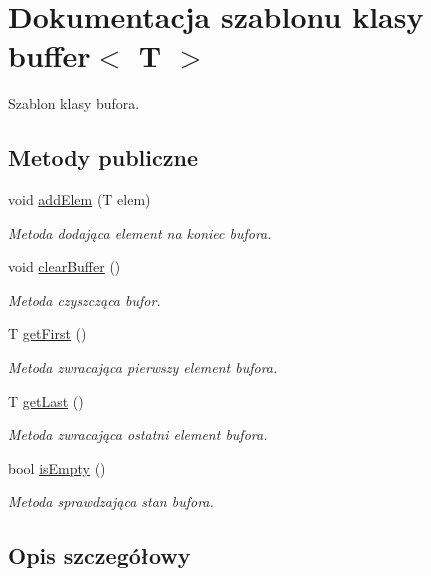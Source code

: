 \hypertarget{classbuffer}{}\section{Dokumentacja szablonu klasy buffer$<$ T $>$}
\label{classbuffer}


Szablon klasy bufora.  


\subsection*{Metody publiczne}
\begin{DoxyCompactItemize}
\item 
void \hyperlink{classbuffer_ac93ddd3a9a4bfbb30dc4df278cb51f8a}{add\+Elem} (T elem)
\begin{DoxyCompactList}\small\item\em Metoda dodająca element na koniec bufora. \end{DoxyCompactList}\item 
void \hyperlink{classbuffer_ab0d55e3e80f82ff361c9a6f14599fe19}{clear\+Buffer} ()
\begin{DoxyCompactList}\small\item\em Metoda czyszcząca bufor. \end{DoxyCompactList}\item 
T \hyperlink{classbuffer_a12c4847a2d852f62f6e17cda43d3720d}{get\+First} ()
\begin{DoxyCompactList}\small\item\em Metoda zwracająca pierwszy element bufora. \end{DoxyCompactList}\item 
T \hyperlink{classbuffer_a61bf98727f79c794f4e77b36499a87f9}{get\+Last} ()
\begin{DoxyCompactList}\small\item\em Metoda zwracająca ostatni element bufora. \end{DoxyCompactList}\item 
bool \hyperlink{classbuffer_a6529128cce7c8b3f85cdae95f22b0589}{is\+Empty} ()
\begin{DoxyCompactList}\small\item\em Metoda sprawdzająca stan bufora. \end{DoxyCompactList}\end{DoxyCompactItemize}


\subsection{Opis szczegółowy}
